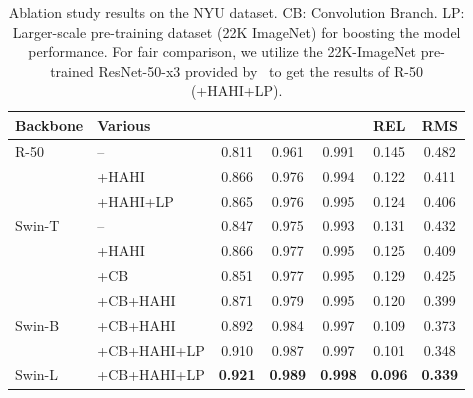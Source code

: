 \documentclass[twocolumn]{svjour3}    \pdfoutput=1
\begin{document}
 
\begin{table*}[htbp]
    \centering
    \begin{adjustbox}{width=0.750\linewidth,center}
        \begin{tabular}{@{}llccccc@{}}
            \toprule
            Backbone  & Various & \textbf{} & \textbf{} & \textbf{} & REL & RMS \\ 
            \midrule
            \multirow{3}{*}{R-50~\citep{he2016resenet}}  
            & -- & 0.811 & 0.961 & 0.991 & 0.145 &  0.482 \\
            & +HAHI & 0.866 & 0.976 & 0.994 & 0.122 &  0.411 \\

            & +HAHI+LP & 0.865 & 0.976 & 0.995 & 0.124 & 0.406 \\
            \midrule
            \multirow{4}{*}{Swin-T~\citep{liu2021swin}} 
            & -- & 0.847 & 0.975 & 0.993 & 0.131 & 0.432 \\
            & +HAHI & 0.866 & 0.977 & 0.995 & 0.125 & 0.409 \\
            & +CB & 0.851 & 0.977 & 0.995 & 0.129 & 0.425 \\
& +CB+HAHI & 0.871 & 0.979 & 0.995 & 0.120 & 0.399 \\
            \midrule
            \multirow{2}{*}{Swin-B~\citep{liu2021swin}} 
            & +CB+HAHI & 0.892 & 0.984 & 0.997 & 0.109 & 0.373 \\
            & +CB+HAHI+LP & 0.910 & 0.987 & 0.997 & 0.101 & 0.348 \\
            \midrule
            Swin-L~\citep{liu2021swin}
            & +CB+HAHI+LP & \textbf{0.921} & \textbf{0.989} & \textbf{0.998} & \textbf{0.096} & \textbf{0.339} \\
            \bottomrule
        \end{tabular}
    \end{adjustbox}
    \caption{Ablation study results on the NYU dataset. CB: Convolution Branch. LP: Larger-scale pre-training dataset (22K ImageNet) for boosting the model  performance. For fair comparison, we utilize the 22K-ImageNet pre-trained ResNet-50-x3 provided by~\citep{kolesnikov2020big} to get the results of R-50 (+HAHI+LP).}
    \label{tab:nyu_ablation}
\end{table*} 
\end{document}
